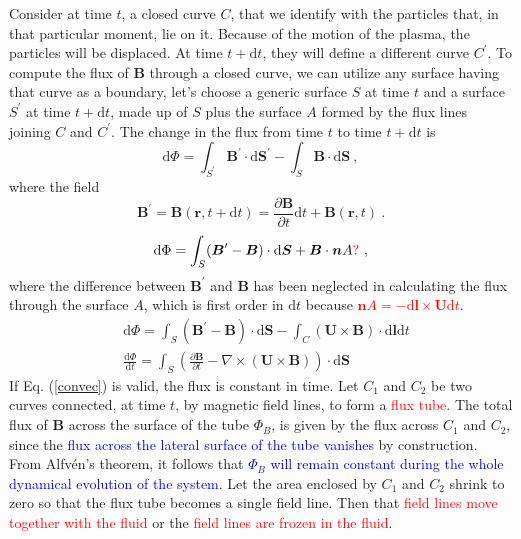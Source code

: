 \documentclass[12pt,a4paper]{article}
\renewcommand{\vec}[1]{\boldsymbol{#1}}
\newcommand{\dif}{\mathrm{d}}
\newcounter{theo}[section]\setcounter{theo}{0}
\begin{document}
Consider at time $t$, a closed curve $C$, that we identify with the particles that, in that particular moment, lie on it. Because of the motion of the plasma, the particles will be displaced. At time $t + \dif t$, they will define a different curve $C^\prime$. To compute the flux of $\vec{B}$ through a closed curve, we can utilize any surface having that curve as a boundary, let's choose a generic surface $S$ at time $t$ and a surface $S^\prime$ at time $t + \dif t$, made up of $S$ plus the surface $A$ formed by the flux lines joining $C$ and $C^\prime$. The change in the flux from time $t$ to time $t + \dif t$ is
\begin{equation*}
\dif \Phi = \int_{S^\prime} \vec{B}^\prime \cdot \dif  \vec{S}^\prime - \int_{S} \vec{B} \cdot \dif  \vec{S} ~,
\end{equation*}
where the field
\begin{equation*}
\vec{B}^\prime  = \vec{B}( \vec{r}, t + \dif t) = \frac{\partial \vec{B} }{\partial t} \dif t +\vec{B}( \vec{r}, t) ~.
\end{equation*}
\begin{align*}
\dif \Phi = \int_{S} (\vec{B}^\prime-\vec{B}) \cdot \dif  \vec{S} +\vec{B} \cdot \vec{n} A \textcolor{red}{?} ~,
\end{align*}
where the difference between $\vec{B}^\prime$ and $\vec{B}$ has been neglected in calculating the flux through the surface $A$, which is first order in $\dif t$ because \textcolor{red}{$\vec{n}A = -\dif \vec{l}\times \vec{U} \dif t$}.
\begin{align*}
& \dif \Phi = \int_{S} (\vec{B}^\prime-\vec{B}) \cdot \dif  \vec{S} -\int_C (\vec{U} \times \vec{B}) \cdot \dif \vec{l} \dif t \\
& \frac{\dif \Phi }{\dif t} = \int_S \left(\frac{\partial \vec{B} }{\partial t} -\nabla \times (\vec{U} \times \vec{B}) \right) \cdot \dif \vec{S}
\end{align*}
If Eq. (\ref{convec}) is valid, the flux is constant in time. Let $C_1$ and $C_2$ be two curves connected, at time $t$, by magnetic field lines, to form a \textcolor{red}{flux tube}. The total flux of $\vec{B}$ across the surface of the tube $\Phi_B$, is given by the flux across $C_1$ and $C_2$, since the \textcolor{blue}{flux across the lateral surface of the tube vanishes} by construction. From Alfv\'en's theorem, it follows that \textcolor{blue}{$\Phi_B$ will remain constant during the whole dynamical evolution of the system}. Let the area enclosed by $C_1$ and $C_2$ shrink to zero so that the flux tube becomes a single field line. Then that \textcolor{red}{field lines move together with the fluid} or the \textcolor{red}{field lines are frozen in the fluid}. 
\end{document}
